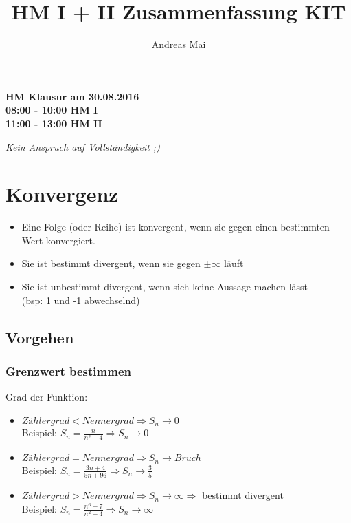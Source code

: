 \documentclass[a4paper,portrait]{scrartcl}
\author{Andreas Mai}
\title{HM I + II Zusammenfassung KIT}
\begin{document}
\maketitle
\begin{center}
\textbf{HM Klausur am 30.08.2016} \\
\textbf{08:00 - 10:00 HM I} \\
\textbf{11:00 - 13:00 HM II} 
\end{center}

\begin{center}
\textit{Kein Anspruch auf Vollständigkeit ;)}
\end{center}\clearpage
\tableofcontents
\clearpage
\setcounter{page}{1}
\section{Konvergenz}
\begin{itemize}
  \item Eine Folge (oder Reihe) ist konvergent, wenn sie gegen einen bestimmten Wert konvergiert.
  \item Sie ist bestimmt divergent, wenn sie gegen $ \pm  \infty $ läuft
  \item Sie ist unbestimmt divergent, wenn sich keine Aussage machen lässt \\ (bsp: 1 und -1 abwechselnd)
\end{itemize}

\subsection{Vorgehen}
\subsubsection{Grenzwert bestimmen}
Grad der Funktion:
\begin{itemize}
  \item $Zählergrad < Nennergrad \Rightarrow  S_{n} \rightarrow 0$ \\
  Beispiel: $S_{n} = \frac{n}{n^2+4} \Rightarrow S_{n} \rightarrow 0$
  \item $Zählergrad = Nennergrad \Rightarrow  S_{n} \rightarrow Bruch$ \\
    Beispiel: $S_{n} = \frac{3n+4}{5n+96} \Rightarrow S_{n} \rightarrow \frac{3}{5}$
  \item $Zählergrad > Nennergrad \Rightarrow  S_{n} \rightarrow \infty \Rightarrow $ bestimmt divergent \\
    Beispiel: $S_{n} = \frac{n^6-7}{n^2+4} \Rightarrow S_{n} \rightarrow \infty$
\end{itemize}
\end{document}
